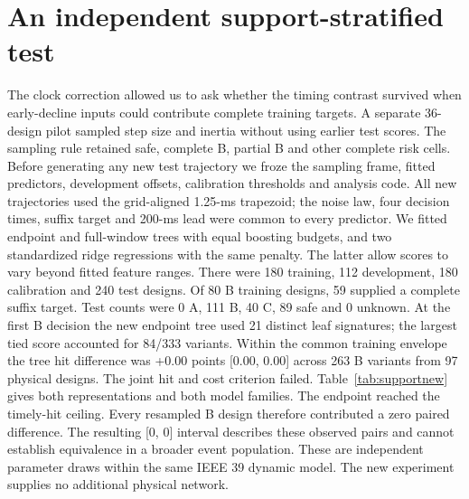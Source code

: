 \documentclass[10pt]{article}
\begin{document}
\section{An independent support-stratified test}
The clock correction allowed us to ask whether the timing contrast survived when early-decline inputs could contribute complete training targets. A separate 36-design pilot sampled step size and inertia without using earlier test scores. The sampling rule retained safe, complete B, partial B and other complete risk cells. Before generating any new test trajectory we froze the sampling frame, fitted predictors, development offsets, calibration thresholds and analysis code. All new trajectories used the grid-aligned 1.25-ms trapezoid; the noise law, four decision times, suffix target and 200-ms lead were common to every predictor. We fitted endpoint and full-window trees with equal boosting budgets, and two standardized ridge regressions with the same penalty. The latter allow scores to vary beyond fitted feature ranges.
There were 180 training, 112 development, 180 calibration and 240 test designs. Of 80 B training designs, 59 supplied a complete suffix target. Test counts were 0 A, 111 B, 40 C, 89 safe and 0 unknown. At the first B decision the new endpoint tree used 21 distinct leaf signatures; the largest tied score accounted for 84/333 variants. Within the common training envelope the tree hit difference was +0.00 points [0.00, 0.00] across 263 B variants from 97 physical designs. The joint hit and cost criterion failed. Table~\ref{tab:supportnew} gives both representations and both model families.
The endpoint reached the timely-hit ceiling. Every resampled B design therefore contributed a zero paired difference. The resulting [0, 0] interval describes these observed pairs and cannot establish equivalence in a broader event population. These are independent parameter draws within the same IEEE 39 dynamic model. The new experiment supplies no additional physical network.
\par
\end{document}
